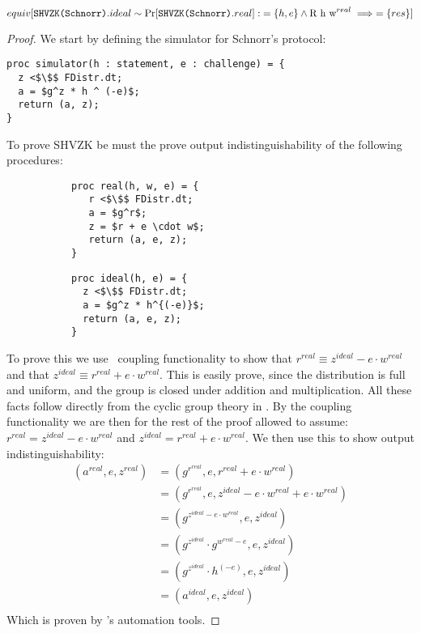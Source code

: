 \begin{lemma}
  \[
    equiv[\texttt{SHVZK(Schnorr)}.ideal \sim \operatorname{Pr}[\texttt{SHVZK(Schnorr)}.real] :\; =\{h,e\} \land \text{R h w}^{real} \implies =\{res\}]
  \]
\end{lemma}
\begin{proof}
  We start by defining the simulator for Schnorr's protocol:
\begin{lstlisting}[mathescape]
proc simulator(h : statement, e : challenge) = {
  z <$\$$ FDistr.dt;
  a = $g^z * h ^ (-e)$;
  return (a, z);
}
\end{lstlisting}
  To prove SHVZK be must the prove output indistinguishability of the following procedures:
  \begin{figure}[ht]
    \centering
    \begin{subfigure}{0.48\textwidth }
\begin{lstlisting}[mathescape]
proc real(h, w, e) = {
   r <$\$$ FDistr.dt;
   a = $g^r$;
   z = $r + e \cdot w$;
   return (a, e, z);
}
\end{lstlisting}
    \end{subfigure}
    \hfill
    \begin{subfigure}{0.48\textwidth }
\begin{lstlisting}[mathescape]
proc ideal(h, e) = {
  z <$\$$ FDistr.dt;
  a = $g^z * h^{(-e)}$;
  return (a, e, z);
}
\end{lstlisting}
    \end{subfigure}
  \end{figure}
  To prove this we use \easycrypt\ coupling functionality to show that $r^{real} \equiv z^{ideal} - e \cdot w^{real}$ and that $z^{ideal} \equiv r^{real} + e \cdot w^{real}$.
  This is easily prove, since the distribution is full and uniform, and the group is closed under addition and multiplication. All these facts follow directly from the cyclic group theory in \easycrypt.
  By the coupling functionality we are then for the rest of the proof allowed to assume:
  $r^{real} = z^{ideal} - e \cdot w^{real}$ and $z^{ideal} = r^{real} + e \cdot
  w^{real}$. We then use this to show output indistinguishability:
  \begin{align*}
    (a^{real}, e, z^{real}) &= (g^{r^{real}}, e, r^{real} + e \cdot w^{real}) \\
                          &= (g^{r^{real}}, e, z^{ideal} - e \cdot w^{real} + e \cdot w^{real}) \\
                          &= (g^{z^{ideal} - e \cdot w^{real}}, e, z^{ideal}) \\
                          &= (g^{z^{ideal}} \cdot g^{w^{real} - e}, e, z^{ideal}) \\
                          &= (g^{z^{ideal}} \cdot h^{(-e)}, e, z^{ideal}) \\
                          &= (a^{ideal}, e, z^{ideal}) \\
  \end{align*}
  Which is proven by \easycrypt's automation tools.
\end{proof}





